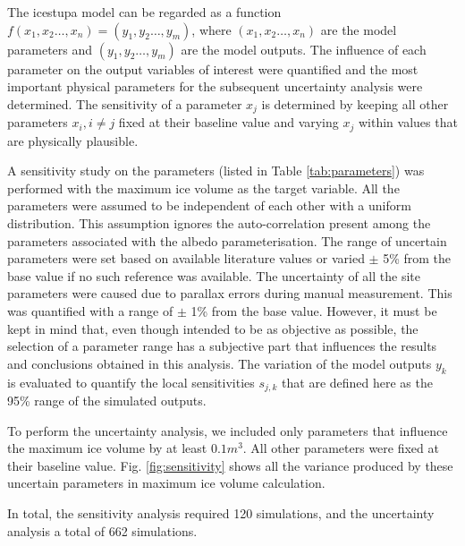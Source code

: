 \documentclass[utf8]{frontiersSCNS} %
\begin{document}
The icestupa model can be regarded as a function $f(x_1,x_2 \dots, x_n) = (y_1,y_2 \dots, y_m)$, where $(x_1,x_2
\dots, x_n)$ are the model parameters and $(y_1,y_2 \dots, y_m)$ are the model outputs. The influence of each
parameter on the output variables of interest were quantified and the most important physical parameters for the
subsequent uncertainty analysis were determined. The sensitivity of a parameter $x_j$ is determined by keeping all
other parameters $x_i, i \neq j$ fixed at their baseline value and varying $x_j$ within values that are physically
plausible.

A sensitivity study on the parameters (listed in Table \ref{tab:parameters}) was performed with the maximum ice
volume as the target variable. All the parameters were assumed to be independent of each other with a uniform
distribution.  This assumption ignores the auto-correlation present among the parameters associated with the albedo
parameterisation.  The range of uncertain parameters were set based on available literature values or varied $\pm$ 5\%
from the base value if no such reference was available. The uncertainty of all the site parameters were caused due to
parallax errors during manual measurement. This was quantified with a range of $\pm$ 1\% from the base value. However,
it must be kept in mind that, even though intended to be as objective as possible, the selection of a parameter range
has a subjective part that influences the results and conclusions obtained in this analysis.  The variation of the
model outputs $y_k$ is evaluated to quantify the local sensitivities $s_{j,k}$ that are defined here as the 95\% range
of the simulated outputs.

To perform the uncertainty analysis, we included only parameters that influence the maximum ice volume by at least
$0.1 m^3$. All other parameters were fixed at their baseline value.  Fig. \ref{fig:sensitivity} shows all the variance
produced by these uncertain parameters in maximum ice volume calculation. 

% 
% 
% 
In total, the sensitivity analysis required 120 simulations, and the uncertainty analysis a total of 662 simulations.
\end{document}
